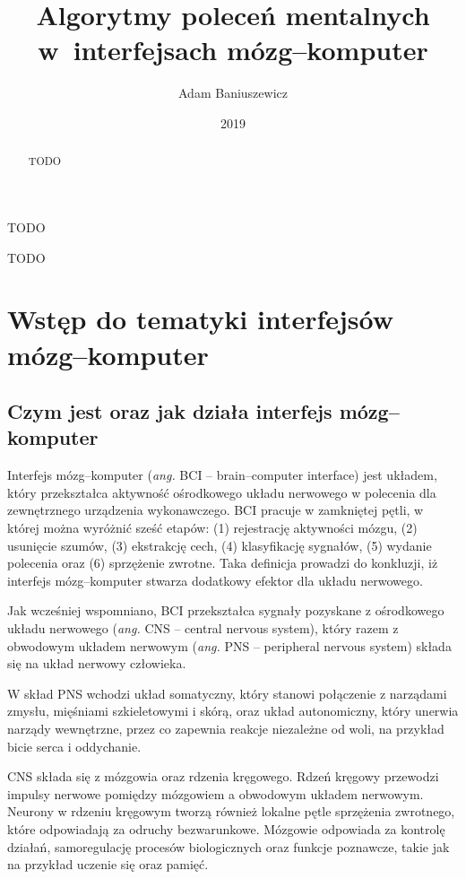 \documentclass[skorowidz,skroty]{dyplomWEZUT}
\author{Adam Baniuszewicz}
\title{Algorytmy poleceń mentalnych w~interfejsach mózg--komputer}
\date{2019}
\begin{document}
\begin{streszczenie}
TODO
\end{streszczenie}

\begin{abstract}
TODO
\end{abstract}

\maketitle

\begin{wprowadzenie}

TODO

\end{wprowadzenie}



\chapter{Wstęp do tematyki interfejsów mózg--komputer}
\section{Czym jest oraz jak działa interfejs mózg--komputer}
Interfejs mózg--komputer (\textit{ang.} BCI -- brain--computer interface) jest układem, który przekształca aktywność ośrodkowego układu nerwowego w polecenia dla zewnętrznego urządzenia wykonawczego. BCI pracuje w zamkniętej pętli, w której można wyróżnić sześć etapów: (1) rejestrację aktywności mózgu, (2) usunięcie szumów, (3) ekstrakcję cech, (4) klasyfikację sygnałów, (5) wydanie polecenia oraz (6) sprzężenie zwrotne\cite{bci_foundations}. Taka definicja prowadzi do konkluzji, iż interfejs mózg--komputer stwarza dodatkowy efektor dla układu nerwowego\cite{bci_principles}.

Jak wcześniej wspomniano, BCI przekształca sygnały pozyskane z ośrodkowego układu nerwowego (\textit{ang.} CNS -- central nervous system), który razem z obwodowym układem nerwowym (\textit{ang.} PNS -- peripheral nervous system) składa się na układ nerwowy człowieka.

W skład PNS wchodzi układ somatyczny, który stanowi połączenie z narządami zmysłu, mięśniami szkieletowymi i skórą, oraz układ autonomiczny, który unerwia narządy wewnętrzne, przez co zapewnia reakcje niezależne od woli, na przykład bicie serca i oddychanie\cite{bci_introduction}.

CNS składa się z mózgowia oraz rdzenia kręgowego. Rdzeń kręgowy przewodzi impulsy nerwowe pomiędzy mózgowiem a obwodowym układem nerwowym. Neurony w rdzeniu kręgowym tworzą również lokalne pętle sprzężenia zwrotnego, które odpowiadają za odruchy bezwarunkowe\cite{bci_introduction}. Mózgowie odpowiada za kontrolę działań, samoregulację procesów biologicznych oraz funkcje poznawcze, takie jak na przykład uczenie się oraz pamięć.
\end{document}
